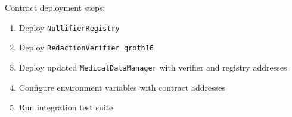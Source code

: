 Contract deployment steps:
\begin{enumerate}
    \item Deploy \texttt{NullifierRegistry}
    \item Deploy \texttt{RedactionVerifier\_groth16}
    \item Deploy updated \texttt{MedicalDataManager} with verifier and registry addresses
    \item Configure environment variables with contract addresses
    \item Run integration test suite
\end{enumerate}


